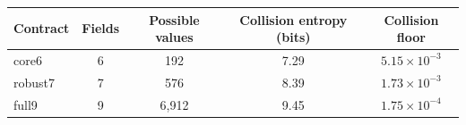 \begin{tabular}{@{}lcccc@{}}
\toprule
Contract & Fields & Possible values & Collision entropy (bits) & Collision floor \\
\midrule
core6 & 6 & 192 & 7.29 & $5.15\times10^{-3}$ \\
robust7 & 7 & 576 & 8.39 & $1.73\times10^{-3}$ \\
full9 & 9 & 6,912 & 9.45 & $1.75\times10^{-4}$ \\
\bottomrule
\end{tabular}
